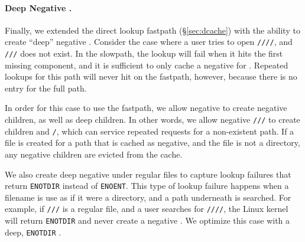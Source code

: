 

\paragraph{Deep Negative \Dentries{}.}
\label{sec:readdir:deep}
Finally, we extended the direct lookup fastpath (\S\ref{sec:dcache}) 
with the ability to create ``deep'' negative \dentries{}.
Consider the case where a user tries to open {\tt /\fnone{}/\fntwo{}/\fnthree{}/\fnfour{}},
and {\tt /\fnone{}/\fntwo{}/\fnthree{}} does not exist.
In the slowpath, 
the lookup will fail when it hits the first missing component, and it is sufficient to only cache
a negative \dentry{} for {\tt \fnthree{}}.
Repeated lookups for this path will never hit on the fastpath, however, because there is no entry for 
the full path.


In order for this case to use the fastpath, we allow negative \dentries{} to create negative children,
as well as deep children.
In other words, we allow negative \dentry{} {\tt /\fnone{}/\fntwo{}/\fnthree{}} to create children {\tt \fnfour{}} and {\tt \fnfour{}/\fnfive{}},
which can service repeated requests for a non-existent path.
If a file is created for a path that is cached as negative, and the file is not a directory, any negative children are evicted from the cache.

We also create deep negative \dentries{} under regular files to capture lookup failures that return {\tt ENOTDIR} instead of {\tt ENOENT}.
This type of lookup failure happens when a filename is 
use as if it were a directory, and a path underneath is searched.
For example, if {\tt /\fnone{}/\fntwo{}/\fnthree{}} is a regular file, and a user searches for {\tt /\fnone{}/\fntwo{}/\fnthree{}/\fnfour{}}, the Linux kernel will return {\tt ENOTDIR} and never create a negative \dentry{}.
We optimize this case with a deep, {\tt ENOTDIR} \dentry{}.
 

